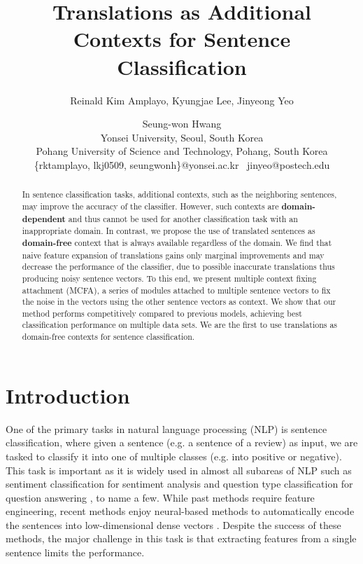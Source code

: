 \documentclass{article}
\title{Translations as Additional Contexts for Sentence Classification}
\author{Reinald Kim Amplayo{,}
  Kyungjae Lee{,}
  Jinyeong Yeo \and
  Seung-won Hwang \\
  Yonsei University, Seoul, South Korea \\
  Pohang University of Science and Technology, Pohang, South Korea \\
  {\{rktamplayo, lkj0509, seungwonh\}@yonsei.ac.kr~	
  jinyeo@postech.edu} \\
}
\begin{document}
\maketitle
\begin{abstract}
In sentence classification tasks, additional contexts, such as the neighboring sentences, may improve the accuracy of the classifier.
However, such contexts are {\bf domain-dependent} and thus cannot be used for another classification task with an inappropriate domain.
In contrast, we propose the use of translated sentences
as {\bf domain-free} context 
that is always available regardless of the domain.
We find that naive feature expansion of translations gains only marginal improvements and may decrease the performance of the classifier, due to possible inaccurate translations thus producing noisy sentence vectors.
To this end, we present 
multiple context fixing attachment (MCFA), a series of modules attached to multiple sentence vectors to fix the noise in the vectors using the other sentence vectors as context. 
We show that our method performs competitively compared to previous
models, achieving best classification performance on multiple data sets.
We are the first to use translations as domain-free contexts for sentence classification.
\end{abstract}

\setlength{\parskip}{0pt}
\setlength{\abovedisplayskip}{0pt}\setlength{\belowdisplayskip}{0pt}\setlength{\abovedisplayshortskip}{0pt}\setlength{\belowdisplayshortskip}{0pt}\setlength{\jot}{0pt}
\setlength{\textfloatsep}{10pt}

\renewcommand{\footnotesize}{\normalsize}

\makeatletter
\renewcommand\paragraph{\@startsection{paragraph}{4}{\z@}{\parskip}{-1em}{\normalfont\normalsize\bfseries}}

\section{Introduction}\label{sec:intro}

One of the primary tasks in natural language processing (NLP) is sentence classification, where given a sentence (e.g. a sentence of a review) as input, we are tasked to classify it into one of multiple classes (e.g. into positive or negative). This task is important as it is widely used in almost all subareas of NLP such as sentiment classification for sentiment analysis \cite{Pang2007OpinionMA} and question type classification for question answering \cite{li2002learning}, to name a few. While past methods require feature engineering, recent methods enjoy neural-based methods to automatically encode the sentences into low-dimensional dense vectors \cite{Kim2014ConvolutionalNN,Joulin2017BagOT}. 
Despite the success of these methods, the major challenge in this task is that extracting features from a single sentence limits the performance.
\end{document}
